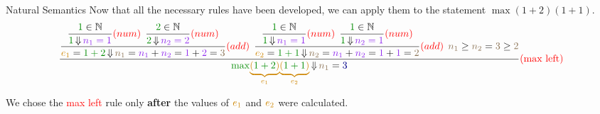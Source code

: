 \begin{example}[Lecture 3]{Natural Semantics}
  Now that all the necessary rules have been developed, we can apply them to the statement $\max (1+2) (1+1)$.
  \begin{equation*}
    \dfrac{
      \dfrac{
        \dfrac{\SemanticInput{1} \in \NaturalNumbers}{\SemanticInput{1} \EvaluatesTo \textcolor{Purple2}{n_{1} = 1}} \textcolor{red}{(num)} \:\:
        \dfrac{\SemanticInput{2} \in \NaturalNumbers}{\SemanticInput{2} \EvaluatesTo \textcolor{Purple2}{n_{2} = 2}} \textcolor{red}{(num)}}
      {\textcolor{Orange3}{e_{1}} = \SemanticInput{1+2} \EvaluatesTo \textcolor{Burlywood4}{n_{1}} = \textcolor{Purple2}{n_{1}} + \textcolor{Purple2}{n_{2}} = \textcolor{Purple2}{1}+\textcolor{Purple2}{2}=\textcolor{Burlywood4}{3}} \textcolor{red}{(add)} \:\:
      \dfrac{
        \dfrac{\SemanticInput{1} \in \NaturalNumbers}{\SemanticInput{1} \EvaluatesTo \textcolor{Purple2}{n_{1} = 1}} \textcolor{red}{(num)} \:\:
        \dfrac{\SemanticInput{1} \in \NaturalNumbers}{\SemanticInput{1} \EvaluatesTo \textcolor{Purple2}{n_{2} = 1}} \textcolor{red}{(num)}}
      {\textcolor{Orange3}{e_{2}} = \SemanticInput{1+1} \EvaluatesTo \textcolor{Burlywood4}{n_{2}} = \textcolor{Purple2}{n_{1}} + \textcolor{Purple2}{n_{2}} = \textcolor{Purple2}{1}+\textcolor{Purple2}{1} = \textcolor{Burlywood4}{2}} \textcolor{red}{(add)} \:\:
      \textcolor{Burlywood4}{n_{1}} \geq \textcolor{Burlywood4}{n_{2}} = \textcolor{Burlywood4}{3} \geq \textcolor{Burlywood4}{2}}
    {\SemanticInput{\mathtt{\max}} \textcolor{Orange3}{\underbrace{(\SemanticInput{1+2}\textcolor{Orange3}{)}}_{\textcolor{Orange3}{e_{1}}}} \textcolor{Orange3}{\underbrace{\textcolor{Orange3}{(\SemanticInput{1+1}\textcolor{Orange3}{)}}}_{\textcolor{Orange3}{e_{2}}}} \EvaluatesTo \textcolor{Burlywood4}{n_{1}} = \textcolor{Blue4}{3}} \textcolor{red}{(\text{max left})}
  \end{equation*}

  We chose the \textcolor{red}{max left} rule only \textbf{after} the values of $\textcolor{Orange3}{e_{1}}$ and $\textcolor{Orange3}{e_{2}}$ were calculated.
\end{example}


